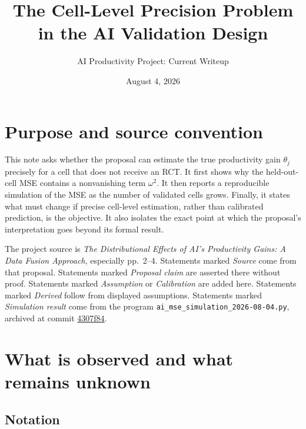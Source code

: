 \documentclass[11pt]{article}
\title{The Cell-Level Precision Problem in the AI Validation Design}
\author{AI Productivity Project: Current Writeup}
\date{August 4, 2026}
\begin{document}
\maketitle

\section*{Purpose and source convention}

This note asks whether the proposal can estimate the true productivity gain
\(\theta_j\) precisely for a cell that does not receive an RCT. It first
shows why the held-out-cell MSE contains a nonvanishing term \(\omega^2\).
It then reports a reproducible simulation of the MSE as the number of
validated cells grows. Finally, it states what must change if precise
cell-level estimation, rather than calibrated prediction, is the objective.
It also isolates the exact point at which the proposal's interpretation
goes beyond its formal result.

The project source is \textit{The Distributional Effects of AI's Productivity
Gains: A Data Fusion Approach}, especially pp.~2--4. Statements marked
\emph{Source} come from that proposal. Statements marked \emph{Proposal
claim} are asserted there without proof. Statements marked \emph{Assumption}
or \emph{Calibration} are added here. Statements marked \emph{Derived} follow
from displayed assumptions. Statements marked \emph{Simulation result} come
from the program
\texttt{ai\_mse\_simulation\_2026-08-04.py}, archived at commit
\href{https://github.com/michaeljwang6/loo_simulation/commit/4307f84}
{4307f84}.

\section{What is observed and what remains unknown}

\subsection*{Notation}
\end{document}
